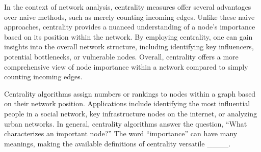 
In the context of network analysis, centrality measures offer several advantages over naive methods, such as merely counting incoming edges.
Unlike these naive approaches, centrality provides a nuanced understanding of a node's importance based on its position within the network.
By employing centrality, one can gain insights into the overall network structure, including identifying key influencers, potential bottlenecks, or vulnerable nodes.
Overall, centrality offers a more comprehensive view of node importance within a network compared to simply counting incoming edges.


Centrality algorithms assign numbers or rankings to nodes within a graph based on their network position.
Applications include identifying the most influential people in a social network, key infrastructure nodes on the internet, or analyzing urban networks.
In general, centrality algorithms answer the question, “What characterizes an important node?”
The word “importance” can have many meanings, making the available definitions of centrality versatile ____.


